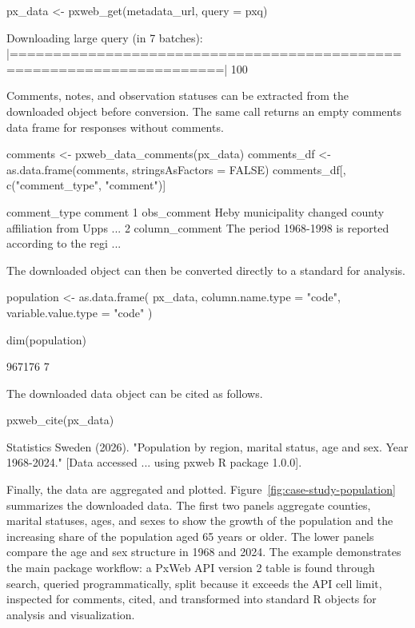 \documentclass[11pt]{article}
\DeclareRobustCommand{\proglang}[1]{\textsf{#1}}
\DeclareRobustCommand{\code}[1]{\texttt{\detokenize{#1}}}
\begin{document}
\begin{Code}
px_data <- pxweb_get(metadata_url, query = pxq)
\end{Code}

\begin{CodeOutput}
Downloading large query (in 7 batches):
|======================================================================| 100%
\end{CodeOutput}

Comments, notes, and observation statuses can be extracted from the downloaded object before conversion.
The same call returns an empty comments data frame for responses without comments.

\begin{Code}
comments <- pxweb_data_comments(px_data)
comments_df <- as.data.frame(comments, stringsAsFactors = FALSE)
comments_df[, c("comment_type", "comment")]
\end{Code}

\begin{CodeOutput}
    comment_type    comment
1    obs_comment    Heby municipality changed county affiliation from Upps ...
2 column_comment    The period 1968-1998 is reported according to the regi ...
\end{CodeOutput}

The downloaded object can then be converted directly to a standard \code{data.frame} for analysis.

\begin{Code}
population <- as.data.frame(
  px_data,
  column.name.type = "code",
  variable.value.type = "code"
)

dim(population)
\end{Code}

\begin{CodeOutput}
[1] 967176      7
\end{CodeOutput}

The downloaded data object can be cited as follows.

\begin{Code}
pxweb_cite(px_data)
\end{Code}

\begin{CodeOutput}
Statistics Sweden (2026). "Population by region, marital status, age
and sex. Year 1968-2024." [Data accessed ... using pxweb R package
1.0.0].
\end{CodeOutput}

Finally, the data are aggregated and plotted.
Figure~\ref{fig:case-study-population} summarizes the downloaded data.
The first two panels aggregate counties, marital statuses, ages, and sexes to show the growth of the population and the increasing share of the population aged 65 years or older.
The lower panels compare the age and sex structure in 1968 and 2024.
The example demonstrates the main package workflow: a PxWeb API version 2 table is found through search, queried programmatically, split because it exceeds the API cell limit, inspected for comments, cited, and transformed into standard \proglang{R} objects for analysis and visualization.
\end{document}
